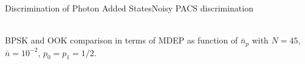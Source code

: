 
\begin{frame}{Discrimination of Photon Added States}{Noisy PACS discrimination}
    \begin{center}
        \resizebox{0.9\textwidth}{!}{
            
        }\\
        \scriptsize{
            BPSK and OOK comparison in terms of MDEP as function of $\bar{n}_p$ 
            with $N=45$, $\bar{n}=10^{-2}$, $p_0=p_1=1/2$.
        }
    \end{center}
    \ \mbox{}\\ \ \mbox{}\\
\end{frame}